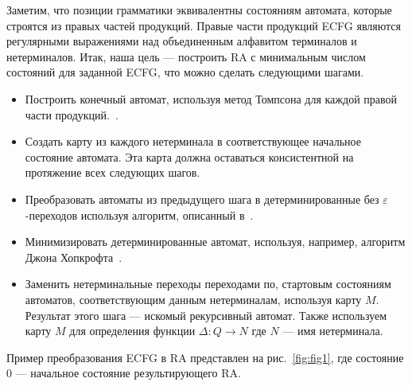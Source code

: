 \documentclass[12pt]{matmex-diploma-custom}
\begin{document}
	Заметим, что позиции грамматики эквивалентны состояниям автомата, которые 
	строятся из правых частей продукций. Правые части продукций ECFG являются регулярными
	выражениями над объединенным алфавитом терминалов и нетерминалов. Итак, наша цель ---
	построить RA с минимальным числом состояний для заданной ECFG, что можно сделать следующими шагами.
	\begin{itemize}
		\item Построить конечный автомат, используя метод Томпсона для каждой правой
		части продукций.~\cite{Thompson:1968:PTR:363347.363387}.
		\item Создать карту из каждого нетерминала в соответствующее начальное состояние автомата.
		Эта карта должна оставаться консистентной на протяжение всех следующих шагов.
		\item Преобразовать автоматы из предыдущего шага в детерминированные без 
		$\varepsilon$-переходов используя алгоритм, описанный в~\cite{aho1974design}.
		\item Минимизировать детерминированные автомат, используя, например, алгоритм
		Джона Хопкрофта~\cite{hopcroft1971n}.
		\item Заменить нетерминальные переходы переходами по, стартовым состояниям автоматов,
		соответствующим данным нетерминалам, используя карту $M$. Результат 
		этого шага --- искомый рекурсивный автомат. Также используем карту $M$
		для определения функции $\Delta : Q \to N$ где $N$ --- имя нетерминала.
	\end{itemize}
	Пример преобразования ECFG в RA представлен на рис.~\ref{fig:fig1}, где состояние
	0 --- начальное состояние результирующего RA.
\end{document}
